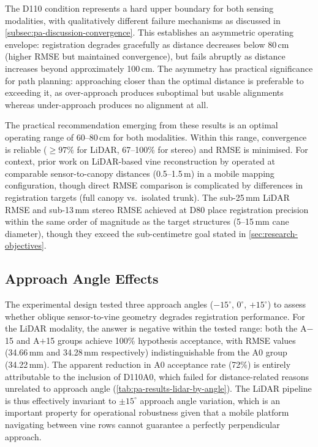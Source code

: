 The D110 condition represents a hard upper boundary for both sensing modalities, with qualitatively different failure mechanisms as discussed in \cref{subsec:pa-discussion-convergence}. This establishes an asymmetric operating envelope: registration degrades gracefully as distance decreases below 80\,cm (higher RMSE but maintained convergence), but fails abruptly as distance increases beyond approximately 100\,cm. The asymmetry has practical significance for path planning: approaching closer than the optimal distance is preferable to exceeding it, as over-approach produces suboptimal but usable alignments whereas under-approach produces no alignment at all.

The practical recommendation emerging from these results is an optimal operating range of 60--80\,cm for both modalities. Within this range, convergence is reliable ($\geq 97\%$ for LiDAR, 67--100\% for stereo) and RMSE is minimised. For context, prior work on LiDAR-based vine reconstruction by \citet{morenoOnGroundVineyardReconstruction2020} operated at comparable sensor-to-canopy distances (0.5--1.5\,m) in a mobile mapping configuration, though direct RMSE comparison is complicated by differences in registration targets (full canopy vs.\ isolated trunk). The sub-25\,mm LiDAR RMSE and sub-13\,mm stereo RMSE achieved at D80 place registration precision within the same order of magnitude as the target structures (5--15\,mm cane diameter), though they exceed the sub-centimetre goal stated in \cref{sec:research-objectives}.

\subsection{Approach Angle Effects}
\label{subsec:pa-discussion-angle}

The experimental design tested three approach angles ($-15^{\circ}$, $0^{\circ}$, $+15^{\circ}$) to assess whether oblique sensor-to-vine geometry degrades registration performance. For the LiDAR modality, the answer is negative within the tested range: both the A$-$15 and A$+$15 groups achieve 100\% hypothesis acceptance, with RMSE values (34.66\,mm and 34.28\,mm respectively) indistinguishable from the A0 group (34.22\,mm). The apparent reduction in A0 acceptance rate (72\%) is entirely attributable to the inclusion of D110A0, which failed for distance-related reasons unrelated to approach angle (\cref{tab:pa-results-lidar-by-angle}). The LiDAR pipeline is thus effectively invariant to $\pm 15^{\circ}$ approach angle variation, which is an important property for operational robustness given that a mobile platform navigating between vine rows cannot guarantee a perfectly perpendicular approach.

